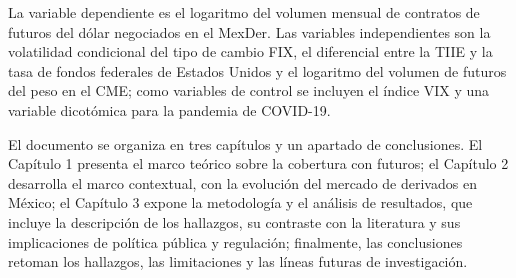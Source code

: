 La variable dependiente es el logaritmo del volumen mensual de contratos de futuros del dólar negociados en el MexDer. Las variables independientes son la volatilidad condicional del tipo de cambio FIX, el diferencial entre la TIIE y la tasa de fondos federales de Estados Unidos y el logaritmo del volumen de futuros del peso en el CME; como variables de control se incluyen el índice VIX y una variable dicotómica para la pandemia de COVID-19.

El documento se organiza en tres capítulos y un apartado de conclusiones. El Capítulo 1 presenta el marco teórico sobre la cobertura con futuros; el Capítulo 2 desarrolla el marco contextual, con la evolución del mercado de derivados en México; el Capítulo 3 expone la metodología y el análisis de resultados, que incluye la descripción de los hallazgos, su contraste con la literatura y sus implicaciones de política pública y regulación; finalmente, las conclusiones retoman los hallazgos, las limitaciones y las líneas futuras de investigación.
